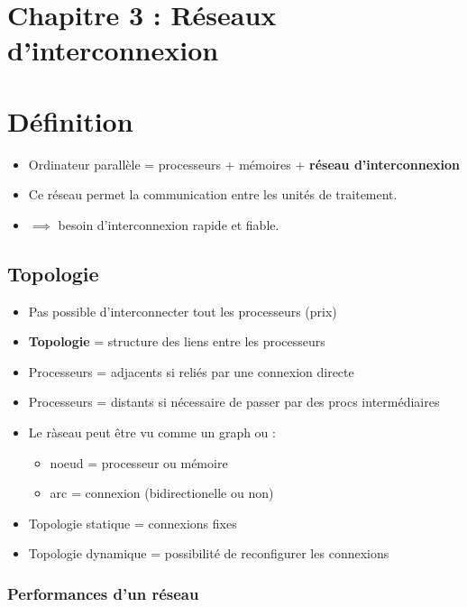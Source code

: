 \documentclass[12pt,a4paper,oneside, titlepage]{article}
\begin{document}
\renewcommand{\labelitemi}{$\bullet$}
\setlength\parindent{0pt}

\section*{Chapitre 3 : Réseaux d’interconnexion}

  \section*{Définition}

    \begin{itemize}
      \item Ordinateur parallèle = processeurs + mémoires + \textbf{réseau d'interconnexion}
      \item Ce réseau permet la communication entre les unités de traitement.
      \item $\implies$ besoin d'interconnexion rapide et fiable.
    \end{itemize}

  \subsection*{Topologie}

    \begin{itemize}
      \item Pas possible d'interconnecter tout les processeurs (prix)
      \item \textbf{Topologie} = structure des liens entre les processeurs
      \item Processeurs = adjacents si reliés par une connexion directe
      \item Processeurs = distants si nécessaire de passer par des procs intermédiaires
      \item Le ràseau peut être vu comme un graph ou :
      \begin{itemize}
        \item noeud = processeur ou mémoire
        \item arc = connexion (bidirectionelle ou non)
      \end{itemize}
      \item Topologie statique = connexions fixes
      \item Topologie dynamique = possibilité de reconfigurer les connexions
    \end{itemize}

    \subsubsection*{Performances d'un réseau}
\end{document}
